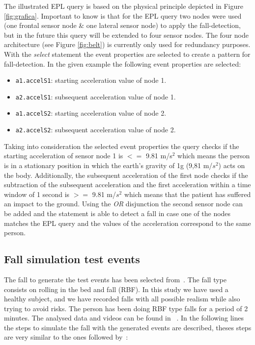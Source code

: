 \documentclass[review]{elsarticle}
\begin{document}
The illustrated EPL query is based on the physical principle depicted in 
Figure \ref{fig:grafica}. Important to know is that for the EPL query two nodes 
were used (one frontal sensor node \& one lateral sensor node) to apply the 
fall-detection, but in the future this query will be extended to four sensor nodes. 
The four node architecture (see Figure \ref{fig:belt}) is currently only used 
for redundancy purposes. With the \textit{select} statement the event properties 
are selected to create a pattern for fall-detection. In the given example the
following event properties are selected:

\begin{itemize}
 \item \texttt{a1.accelS1}: starting acceleration value of node 1.
 \item \texttt{a2.accelS1}: subsequent acceleration value of node 1.
 \item \texttt{a1.accelS2}: starting acceleration value of node 2.
 \item \texttt{a2.accelS2}: subsequent acceleration value of node 2.
\end{itemize}

Taking into consideration the selected event properties the query checks if the 
starting acceleration of sensor node 1 is $<=$ 9.81 m/s$^2$ which means the person 
is in a stationary position in which the earth's gravity of 1g (9,81 m/$s^2$) acts 
on the body. Additionally, the subsequent acceleration of the first node checks if the subtraction of the subsequent acceleration and the first acceleration within a 
time window of 1 second is $>=$ 9.81 m/$s^2$ which means that the patient has 
suffered an impact to the ground. Using the \textit{OR} disjunction the second 
sensor node can be added and the statement is able to detect a fall in case one 
of the nodes matches the EPL query and the values of the acceleration correspond 
to the same person. 
 
\subsection{Fall simulation test events} 

The fall to generate the test events has been selected from~\cite{Li2009,Pannurat2014}. 
The fall type consists on rolling in the bed and fall (RBF). In this study we have used a 
healthy subject, and we have recorded falls with all possible realism while also
trying to avoid risks. The person has been doing RBF type falls for a period of 2 minutes. The analysed 
data and videos can be found in ~\cite{FallRepo}. In the following lines the steps to simulate 
the fall with the generated events are described, theses steps are very similar to the 
ones followed by~\cite{colladomachine,colladoTriaxal}:
\end{document}
